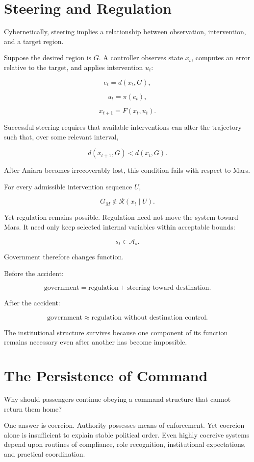 \documentclass[11pt,oneside]{book}
\theoremstyle{definition}
\theoremstyle{remark}
\newcommand{\A}{\mathcal{A}}
\newcommand{\R}{\mathcal{R}}
\begin{document}
\section{Steering and Regulation}

Cybernetically, steering implies a relationship between observation, intervention, and a target region.

Suppose the desired region is \(G\). A controller observes state \(x_t\), computes an error relative to the target, and applies intervention \(u_t\):

\[
e_t=d(x_t,G),
\]

\[
u_t=\pi(e_t),
\]

\[
x_{t+1}=F(x_t,u_t).
\]

Successful steering requires that available interventions can alter the trajectory such that, over some relevant interval,

\[
d(x_{t+1},G)<d(x_t,G).
\]

After Aniara becomes irrecoverably lost, this condition fails with respect to Mars.

For every admissible intervention sequence \(U\),

\[
G_M\notin\R(x_t\mid U).
\]

Yet regulation remains possible. Regulation need not move the system toward Mars. It need only keep selected internal variables within acceptable bounds:

\[
s_t\in\A_s.
\]

Government therefore changes function.

Before the accident:

\[
\text{government}
=
\text{regulation}
+
\text{steering toward destination}.
\]

After the accident:

\[
\text{government}
\approx
\text{regulation without destination control}.
\]

The institutional structure survives because one component of its function remains necessary even after another has become impossible.

\section{The Persistence of Command}

Why should passengers continue obeying a command structure that cannot return them home?

One answer is coercion. Authority possesses means of enforcement. Yet coercion alone is insufficient to explain stable political order. Even highly coercive systems depend upon routines of compliance, role recognition, institutional expectations, and practical coordination.
\end{document}
